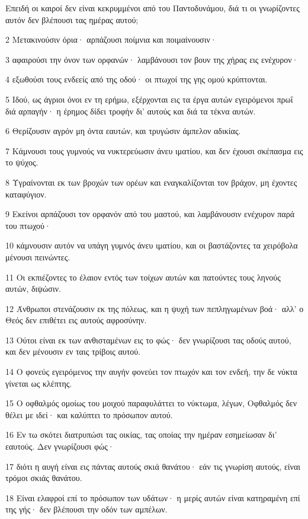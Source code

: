 \par Επειδή οι καιροί δεν είναι κεκρυμμένοι από του Παντοδυνάμου, διά τι οι γνωρίζοντες αυτόν δεν βλέπουσι τας ημέρας αυτού;
\par 2 Μετακινούσιν όρια· αρπάζουσι ποίμνια και ποιμαίνουσιν·
\par 3 αφαιρούσι την όνον των ορφανών· λαμβάνουσι τον βουν της χήρας εις ενέχυρον·
\par 4 εξωθούσι τους ενδεείς από της οδού· οι πτωχοί της γης ομού κρύπτονται.
\par 5 Ιδού, ως άγριοι όνοι εν τη ερήμω, εξέρχονται εις τα έργα αυτών εγειρόμενοι πρωΐ διά αρπαγήν· η έρημος δίδει τροφήν δι' αυτούς και διά τα τέκνα αυτών.
\par 6 Θερίζουσιν αγρόν μη όντα εαυτών, και τρυγώσιν άμπελον αδικίας.
\par 7 Κάμνουσι τους γυμνούς να νυκτερεύωσιν άνευ ιματίου, και δεν έχουσι σκέπασμα εις το ψύχος.
\par 8 Υγραίνονται εκ των βροχών των ορέων και εναγκαλίζονται τον βράχον, μη έχοντες καταφύγιον.
\par 9 Εκείνοι αρπάζουσι τον ορφανόν από του μαστού, και λαμβάνουσιν ενέχυρον παρά του πτωχού·
\par 10 κάμνουσιν αυτόν να υπάγη γυμνός άνευ ιματίου, και οι βαστάζοντες τα χειρόβολα μένουσι πεινώντες.
\par 11 Οι εκπιέζοντες το έλαιον εντός των τοίχων αυτών και πατούντες τους ληνούς αυτών, διψώσιν.
\par 12 Άνθρωποι στενάζουσιν εκ της πόλεως, και η ψυχή των πεπληγωμένων βοά· αλλ' ο Θεός δεν επιθέτει εις αυτούς αφροσύνην.
\par 13 Ούτοι είναι εκ των ανθισταμένων εις το φώς· δεν γνωρίζουσι τας οδούς αυτού, και δεν μένουσιν εν ταις τρίβοις αυτού.
\par 14 Ο φονεύς εγειρόμενος την αυγήν φονεύει τον πτωχόν και τον ενδεή, την δε νύκτα γίνεται ως κλέπτης.
\par 15 Ο οφθαλμός ομοίως του μοιχού παραφυλάττει το νύκτωμα, λέγων, Οφθαλμός δεν θέλει με ιδεί· και καλύπτει το πρόσωπον αυτού.
\par 16 Εν τω σκότει διατρυπώσι τας οικίας, τας οποίας την ημέραν εσημείωσαν δι' εαυτούς. Δεν γνωρίζουσι φώς·
\par 17 διότι η αυγή είναι εις πάντας αυτούς σκιά θανάτου· εάν τις γνωρίση αυτούς, είναι τρόμοι σκιάς θανάτου.
\par 18 Είναι ελαφροί επί το πρόσωπον των υδάτων· η μερίς αυτών είναι κατηραμένη επί της γής· δεν βλέπουσι την οδόν των αμπέλων.

